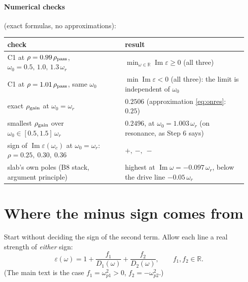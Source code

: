 \documentclass[11pt]{article}
\newcommand{\wpa}{\omega_{p1}}
\newcommand{\wpb}{\omega_{p2}}
\renewcommand{\Im}{\operatorname{Im}}
\begin{document}
\paragraph{Numerical checks} (exact formulas, no approximations):
\begin{center}
\begin{tabular}{@{}>{\raggedright\arraybackslash}p{0.47\linewidth}>{\raggedright\arraybackslash}p{0.49\linewidth}@{}}
\toprule
check & result \\
\midrule
C1 at $\rho=0.99\,\rho_{\rm pass}$, $\omega_0=0.5,\,1.0,\,1.3\,\omega_r$ & $\min_{\omega\in\mathbb R}\Im\varepsilon\ge0$ (all three)\\
C1 at $\rho=1.01\,\rho_{\rm pass}$, same $\omega_0$ & $\min\Im\varepsilon<0$ (all three): the limit is independent of $\omega_0$\\
exact $\rho_{\rm gain}$ at $\omega_0=\omega_r$ & $0.2506$ (approximation \eqref{eq:onres}: $0.25$)\\
smallest $\rho_{\rm gain}$ over $\omega_0\in[0.5,1.5]\,\omega_r$ & $0.2496$, at $\omega_0=1.003\,\omega_r$ (on resonance, as Step 6 says)\\
sign of $\Im\varepsilon(\omega_c)$ at $\omega_0=\omega_r$: $\rho=0.25,\ 0.30,\ 0.36$ & $+,\ -,\ -$\\
slab's own poles (B8 stack, argument principle) & highest at $\Im\omega=-0.097\,\omega_r$, below the drive line $-0.05\,\omega_r$\\
\bottomrule
\end{tabular}
\end{center}


\appendix
\section{Where the minus sign comes from}\label{app:sign}
Start without deciding the sign of the second term. Allow each line a real strength of \emph{either} sign:
\begin{equation}
  \varepsilon(\omega) = 1 + \frac{f_1}{D_1(\omega)} + \frac{f_2}{D_2(\omega)},\qquad f_1,f_2\in\mathbb R .
\end{equation}
(The main text is the case $f_1=\wpa^2>0$, $f_2=-\wpb^2$.)
\end{document}
